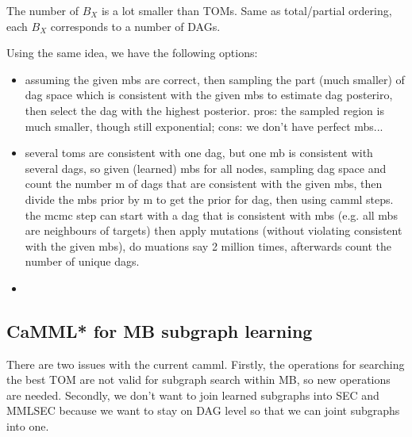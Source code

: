 The number of $B_X$ is a lot smaller than TOMs. Same as total/partial ordering, each $B_X$ corresponds to a number of DAGs. 

Using the same idea, we have the following options: 
\begin{itemize}
\item assuming the given mbs are correct, then sampling the part (much smaller) of dag space which is consistent with the given mbs to estimate dag posteriro, then select the dag with the highest posterior. pros: the sampled region is much smaller, though still exponential; cons: we don't have perfect mbs...
\item several toms are consistent with one dag, but one mb is consistent with several dags, so given (learned) mbs for all nodes, sampling dag space and count the number m of dags that are consistent with the given mbs, then divide the mbs prior by m to get the prior for dag, then using camml steps. the mcmc step can start with a dag that is consistent with mbs (e.g. all mbs are neighbours of targets) then apply mutations (without violating consistent with the given mbs), do muations say 2 million times, afterwards count the number of unique dags. 
\item 
\end{itemize}

\subsection{CaMML* for MB subgraph learning}
There are two issues with the current camml. Firstly, the operations for searching the best TOM are not valid for subgraph search within MB, so new operations are needed. Secondly, we don't want to join learned subgraphs into SEC and MMLSEC because we want to stay on DAG level so that we can joint subgraphs into one. 

